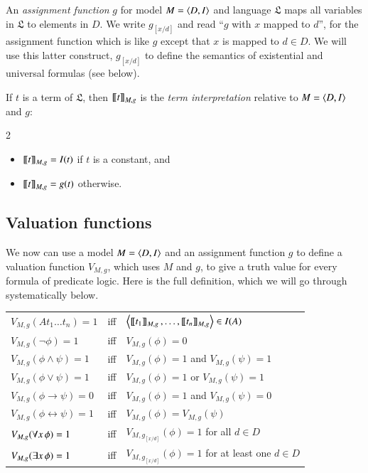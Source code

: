 \documentclass[nobib,nofonts]{tufte-handout}
\begin{document}
An \emph{assignment function} $g$ for model $M = \left \langle D,I\right\rangle$ and language $\mathfrak{L}$ maps all variables in $\mathfrak{L}$ to elements in $D$.
We write $g_{[x/d]}$ and read ``$g$ with $x$ mapped to $d$'', for the assignment function which is like $g$ except that $x$ is mapped to $d \in D$.
We will use this latter construct, $g_{[x/d]}$ to define the semantics of existential and universal formulas (see below).

If $t$ is a term of $\mathfrak{L}$, then $\left [\! \left [ t \right ]\! \right]_{M,g}$ is the \emph{term interpretation} relative to $M = \left \langle D,I\right\rangle$ and $g$:
\begin{multicols}{2}
  \begin{itemize}
    \item[] $\left [\! \left [ t \right ]\! \right]_{M,g} = I(t)$ if $t$ is a constant, and
    \item[] $\left [\! \left [ t \right ]\! \right]_{M,g} = g(t)$ otherwise.
  \end{itemize}
\end{multicols}

\subsection{Valuation functions}
\label{sec:valuation--truth}

We now can use a model $M = \left \langle D, I\right\rangle$ and an assignment function $g$ to define a valuation function $V_{M,g}$, which uses $M$ and $g$, to give a truth value for every formula of predicate logic.
Here is the full definition, which we will go through systematically below.

\medskip

\begin{tabular}{lcl}
  $V_{M,g}(At_1\dots t_n) =1$ & iff & $\left \langle \left [\! \left [ t_1 \right ]\! \right]_{M,g}, \dots, \left [\! \left [ t_n \right ]\! \right]_{M,g}\right\rangle \in I(A)$\\
  $V_{M,g}(\neg \phi) = 1$ & iff & $V_{M,g}(\phi) =0$\\
  $V_{M,g}(\phi \wedge \psi) = 1$ & iff & $V_{M,g}(\phi) =1$ and $V_{M,g}(\psi) = 1$\\
  $V_{M,g}(\phi \vee \psi) = 1$ & iff & $V_{M,g}(\phi) =1$ or $V_{M,g}(\psi) = 1$\\
  $V_{M,g}(\phi \rightarrow \psi) = 0$ & iff & $V_{M,g}(\phi) =1$ and $V_{M,g}(\psi) = 0$\\
  $V_{M,g}(\phi \leftrightarrow \psi) = 1$ & iff & $V_{M,g}(\phi) = V_{M,g}(\psi)$\\
  $V_{M,g}(\forall x \thinspace \phi) = 1$ & iff & $V_{M,g_{[x/d]}}(\phi) = 1$ for all $d \in D$\\
  $V_{M,g}(\exists x \thinspace \phi) = 1$ & iff & $V_{M,g_{[x/d]}}(\phi) = 1$ for at least one $d \in D$
\end{tabular}
\end{document}
